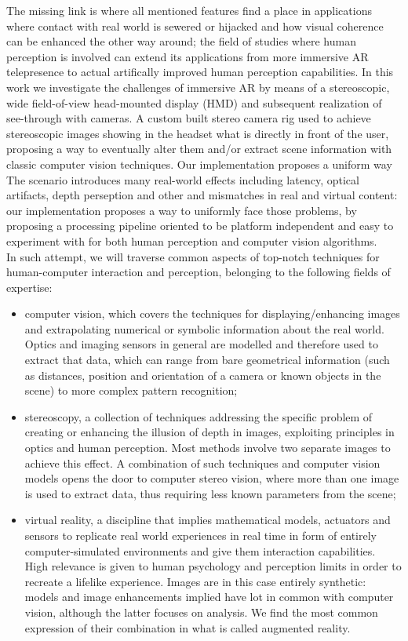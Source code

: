The missing link is where all mentioned features find a place in applications where contact with real world is sewered or hijacked and how visual coherence can be enhanced the other way around; the field of studies where human perception is involved can extend its applications from more immersive AR telepresence to actual artifically improved human perception capabilities. In this work we investigate the challenges of immersive AR by means of a stereoscopic, wide field-of-view head-mounted display (HMD) and subsequent realization of see-through with cameras. A custom built stereo camera rig used to achieve stereoscopic images showing in the headset what is directly in front of the user, proposing a way to eventually alter them and/or extract scene information with classic computer vision techniques. Our implementation proposes a uniform way The scenario introduces many real-world effects including latency, optical artifacts, depth perseption and other and mismatches in real and virtual content: our implementation proposes a way to uniformly face those problems, by proposing a processing pipeline oriented to be platform independent and easy to experiment with for both human perception and computer vision algorithms.\\
In such attempt, we will traverse common aspects of top-notch techniques for human-computer interaction and perception, belonging to the following fields of expertise:
\begin{itemize}
\item computer vision, which covers the techniques for displaying/enhancing images and extrapolating numerical or symbolic information about the real world. Optics and imaging sensors in general are modelled and therefore used to extract that data, which can range from bare geometrical information (such as distances, position and orientation of a camera or known objects in the scene) to more complex pattern recognition;
\item stereoscopy, a collection of techniques addressing the specific problem of creating or enhancing the illusion of depth in images, exploiting principles in optics and human perception. Most methods involve two separate images to achieve this effect. A combination of such techniques and computer vision models opens the door to computer stereo vision, where more than one image is used to extract data, thus requiring less known parameters from the scene;
\item virtual reality, a discipline that implies mathematical models, actuators and sensors to replicate real world experiences in real time in form of entirely computer-simulated environments and give them interaction capabilities. High relevance is given to human psychology and perception limits in order to recreate a lifelike experience. Images are in this case entirely synthetic: models and image enhancements implied have lot in common with computer vision, although the latter focuses on analysis. We find the most common expression of their combination in what is called augmented reality.
\end{itemize}
